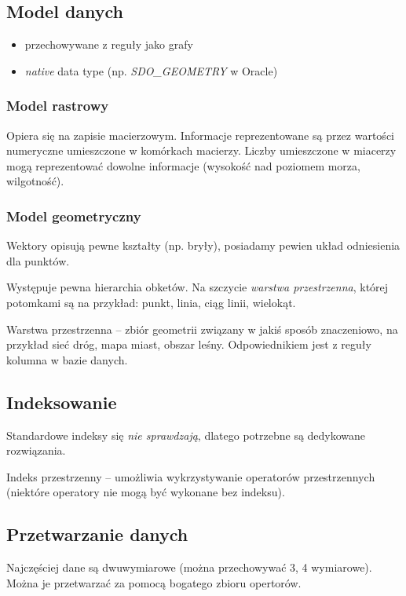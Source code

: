 \documentclass[12pt]{article}
\begin{document}

\subsection{Model danych}
\begin{itemize}
\item przechowywane z reguły jako grafy
\item \emph{native} data type (np. \emph{SDO\_GEOMETRY} w Oracle)
\end{itemize}

\subsubsection{Model rastrowy}
Opiera się na zapisie macierzowym. Informacje reprezentowane są przez wartości
numeryczne umieszczone w komórkach macierzy. Liczby umieszczone w miacerzy mogą
reprezentować dowolne informacje (wysokość nad poziomem morza, wilgotność).


\subsubsection{Model geometryczny}
Wektory opisują pewne kształty (np. bryły), posiadamy pewien układ odniesienia
dla punktów.

Występuje pewna hierarchia obketów. Na szczycie \emph{warstwa przestrzenna},
której potomkami są na przykład: punkt, linia, ciąg linii, wielokąt.

Warstwa przestrzenna -- zbiór geometrii związany w jakiś sposób znaczeniowo, na
przykład sieć dróg, mapa miast, obszar leśny. Odpowiednikiem jest z reguły
kolumna w bazie danych.

\subsection{Indeksowanie}
Standardowe indeksy się \emph{nie sprawdzają}, dlatego potrzebne są dedykowane
rozwiązania.

Indeks przestrzenny -- umożliwia wykrzystywanie operatorów przestrzennych (niektóre
operatory nie mogą być wykonane bez indeksu).

\subsection{Przetwarzanie danych}
Najczęściej dane są dwuwymiarowe (można przechowywać 3, 4 wymiarowe). Można je przetwarzać
za pomocą bogatego zbioru opertorów.
\end{document}

